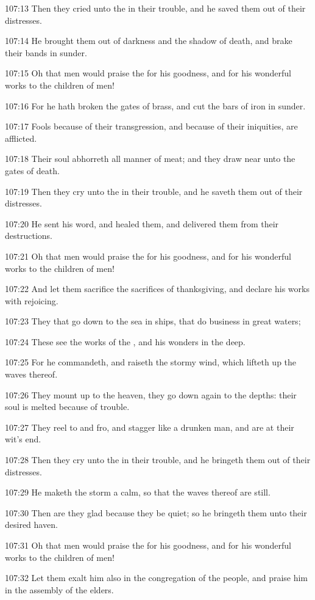 107:13 Then they cried unto the \LORD in their trouble, and he saved them out of their distresses.

107:14 He brought them out of darkness and the shadow of death, and brake their bands in sunder.

107:15 Oh that men would praise the \LORD for his goodness, and for his wonderful works to the children of men!

107:16 For he hath broken the gates of brass, and cut the bars of iron in sunder.

107:17 Fools because of their transgression, and because of their iniquities, are afflicted.

107:18 Their soul abhorreth all manner of meat; and they draw near unto the gates of death.

107:19 Then they cry unto the \LORD in their trouble, and he saveth them out of their distresses.

107:20 He sent his word, and healed them, and delivered them from their destructions.

107:21 Oh that men would praise the \LORD for his goodness, and for his wonderful works to the children of men!

107:22 And let them sacrifice the sacrifices of thanksgiving, and declare his works with rejoicing.

107:23 They that go down to the sea in ships, that do business in great waters;

107:24 These see the works of the \LORD, and his wonders in the deep.

107:25 For he commandeth, and raiseth the stormy wind, which lifteth up the waves thereof.

107:26 They mount up to the heaven, they go down again to the depths: their soul is melted because of trouble.

107:27 They reel to and fro, and stagger like a drunken man, and are at their wit's end.

107:28 Then they cry unto the \LORD in their trouble, and he bringeth them out of their distresses.

107:29 He maketh the storm a calm, so that the waves thereof are still.

107:30 Then are they glad because they be quiet; so he bringeth them unto their desired haven.

107:31 Oh that men would praise the \LORD for his goodness, and for his wonderful works to the children of men!

107:32 Let them exalt him also in the congregation of the people, and praise him in the assembly of the elders.

